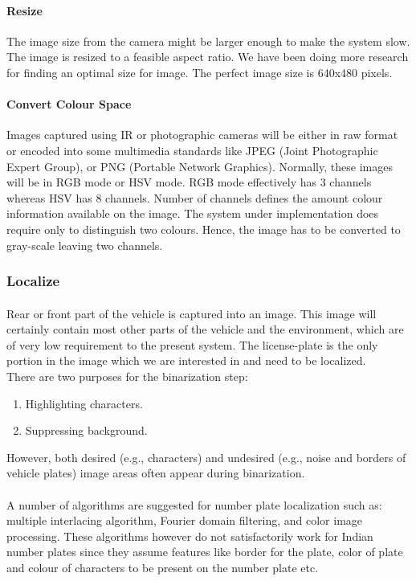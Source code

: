 \documentclass[a4paper,10pt]{iesreport}
\begin{document}
\paragraph*{Resize}
The image size from the camera might be larger enough to make the system slow. The image is resized to a feasible aspect ratio. We have been doing more research for finding an optimal size for image. The perfect image size is 640x480 pixels.
\paragraph*{Convert Colour Space}
Images captured using IR or photographic cameras will be either in raw format or encoded into some multimedia standards like JPEG (Joint Photographic Expert Group), or PNG (Portable Network Graphics). Normally, these images will be in RGB mode or HSV mode. RGB mode effectively has 3 channels whereas HSV has 8 channels. Number of channels defines the amount colour information available on the image. The system under implementation does require only to distinguish two colours. Hence, the image has to be converted to gray-scale leaving two channels. 

\subsubsection{Localize}
\paragraph*{}
Rear or front part of the vehicle is captured into an  image. This image will certainly contain most other parts of the vehicle and the environment, which are of very low requirement to the present system. The license-plate is the only portion in the image which we are interested in and need to be localized. \\
There are two purposes for the binarization step: 
\begin{enumerate}
 \item Highlighting characters. 
 \item Suppressing background.
\end{enumerate}

However, both desired (e.g., characters) and undesired (e.g.,
noise and borders of vehicle plates) image areas often appear
 during binarization.
\paragraph*{}
A number of algorithms are suggested for
 number plate localization such as: multiple
 interlacing algorithm, Fourier domain filtering,
  and color image processing. These algorithms
 however do not satisfactorily work for Indian
 number plates since they assume features like border for the plate, color of plate and colour of
 characters to be present on the number plate etc. 
\end{document}
